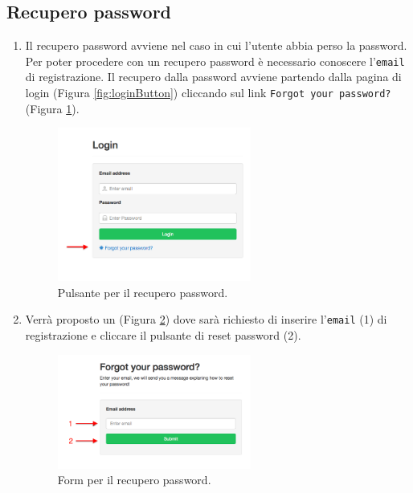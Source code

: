 	\clearpage
	\subsection{Recupero password}
		\label{recuperopassword}
		\begin{enumerate}

			\item Il recupero password avviene nel caso in cui l'utente abbia perso la password. Per poter procedere con un recupero password è necessario conoscere l'\texttt{email} di registrazione. Il recupero dalla password avviene partendo dalla pagina di login (Figura \ref{fig:loginButton}) cliccando sul link \texttt{Forgot your password?} (Figura \ref{fig:forgotpwd}).

			\begin{figure}[H]
				\centering \includegraphics[width=0.6\textwidth]{img/forgotpwd.png}
			\caption{ \label{fig:forgotpwd} Pulsante per il recupero password.}
			\end{figure}

			\item Verrà proposto un  (Figura \ref{fig:forgotPwdForm}) dove sarà richiesto di inserire l'\texttt{email} (1) di registrazione e cliccare il pulsante di reset password (2).

			\begin{figure}[H]
				\centering \includegraphics[width=0.6\textwidth]{img/forgotPwdForm.png}
			\caption{ \label{fig:forgotPwdForm} Form per il recupero password.}
			\end{figure}


\end{enumerate}
